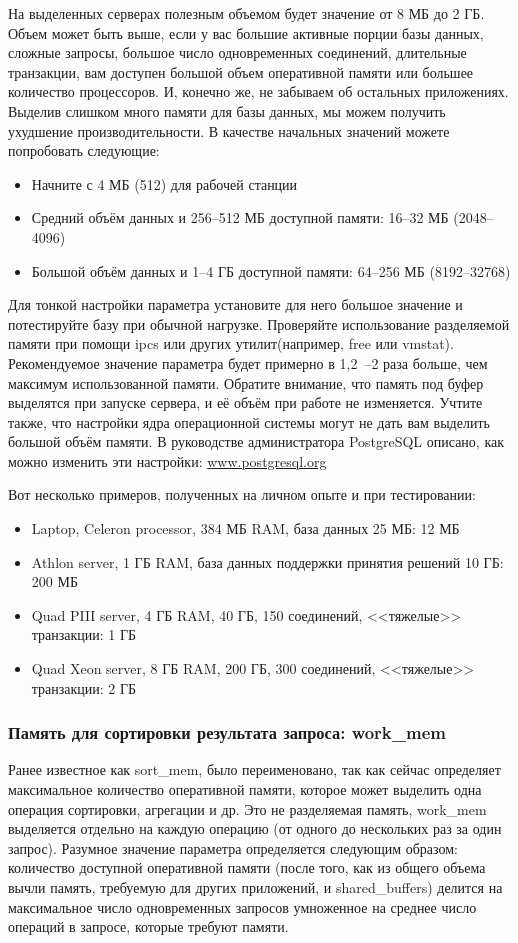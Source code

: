 На выделенных серверах полезным объемом будет значение от 8 МБ до 2 ГБ. 
Объем может быть выше, если у вас большие активные порции базы данных, сложные запросы, большое число 
одновременных соединений, длительные транзакции, вам доступен большой объем оперативной памяти или большее количество 
процессоров. И, конечно же, не забываем об остальных приложениях. Выделив слишком много памяти для базы данных, 
мы можем получить ухудшение производительности. 
В качестве начальных значений можете попробовать следующие:
\begin{itemize}
\item Начните с 4 МБ (512) для рабочей станции
\item Средний объём данных и 256--512 МБ доступной памяти: 16--32 МБ (2048--4096)
\item Большой объём данных и 1--4 ГБ доступной памяти: 64--256 МБ (8192--32768)
\end{itemize}

Для тонкой настройки параметра установите для него большое значение и потестируйте базу при обычной нагрузке. 
Проверяйте использование разделяемой памяти при помощи ipcs или других утилит(например, free или vmstat). 
Рекомендуемое значение параметра 
будет примерно в 1,2~--2 раза больше, чем максимум использованной памяти. Обратите внимание, что память под буфер 
выделятся при запуске сервера, и её объём при работе не изменяется. Учтите также, что настройки ядра операционной 
системы могут не дать вам выделить большой объём памяти. В руководстве администратора PostgreSQL описано, как 
можно изменить эти настройки: \href{http://www.postgresql.org/docs/devel/static/kernel-resources.html}{www.postgresql.org}

Вот несколько примеров, полученных на личном опыте и при тестировании:
\begin{itemize}
\item Laptop, Celeron processor, 384 МБ RAM, база данных 25 МБ: 12 МБ
\item Athlon server, 1 ГБ RAM, база данных поддержки принятия решений 10 ГБ: 200 МБ
\item Quad PIII server, 4 ГБ RAM, 40 ГБ, 150 соединений, <<тяжелые>> транзакции: 1 ГБ
\item Quad Xeon server, 8 ГБ RAM, 200 ГБ, 300 соединений, <<тяжелые>> транзакции: 2 ГБ
\end{itemize}

\subsubsection{Память для сортировки результата запроса: work\_mem}
Ранее известное как sort\_mem, было переименовано, так как сейчас определяет максимальное количество оперативной памяти, 
которое может выделить одна операция сортировки, агрегации и др. Это не разделяемая память, work\_mem выделяется отдельно 
на каждую операцию (от одного до нескольких раз за один запрос). Разумное значение параметра определяется следующим образом: 
количество доступной оперативной памяти (после того, как из общего объема вычли память, требуемую для других приложений, и 
shared\_buffers) делится на максимальное число одновременных запросов умноженное на среднее число операций в запросе, которые 
требуют памяти.

